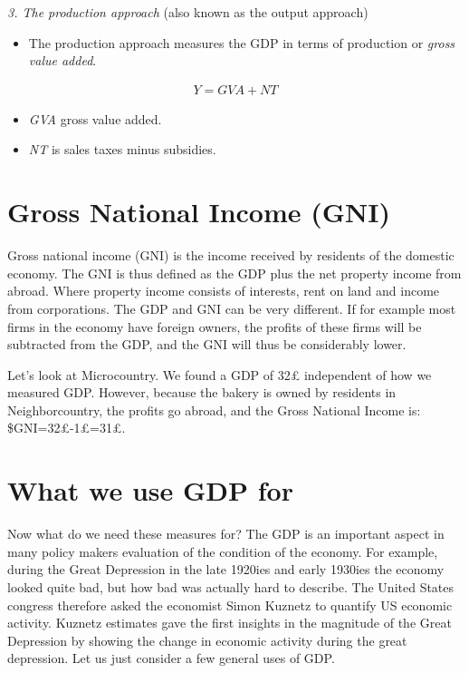 \documentclass[]{book}
\providecommand{\tightlist}{%
  \setlength{\itemsep}{0pt}\setlength{\parskip}{0pt}}
\newenvironment{myblock}%
{%
 \begin{tcolorbox}%
}%
{\end{tcolorbox}}%
\begin{document}
\begin{myblock}
\emph{3. The production approach} (also known as the output approach)

\begin{itemize}
\tightlist
\item
  The production approach measures the GDP in terms of production or
  \emph{gross value added}.
\end{itemize}

\begin{align}
  Y=GVA+NT
\end{align}

\begin{itemize}
\tightlist
\item
  \emph{GVA} gross value added.
\item
  \emph{NT} is sales taxes minus subsidies.
\end{itemize}
\end{myblock}

\hypertarget{gross-national-income-gni}{%
\section{Gross National Income (GNI)}\label{gross-national-income-gni}}

Gross national income (GNI) is the income received by residents of the domestic economy. The GNI is thus defined as the GDP plus the net property income from abroad. Where property income consists of interests, rent on land and income from corporations. The GDP and GNI can be very different. If for example most firms in the economy have foreign owners, the profits of these firms will be subtracted from the GDP, and the GNI will thus be considerably lower.

Let's look at Microcountry. We found a GDP of 32£ independent of how we measured GDP. However, because the bakery is owned by residents in Neighborcountry, the profits go abroad, and the Gross National Income is: \$GNI=32£-1£=31£.

\hypertarget{what-we-use-gdp-for}{%
\section{What we use GDP for}\label{what-we-use-gdp-for}}

Now what do we need these measures for? The GDP is an important aspect in many policy makers evaluation of the condition of the economy. For example, during the Great Depression in the late 1920ies and early 1930ies the economy looked quite bad, but how bad was actually hard to describe. The United States congress therefore asked the economist Simon Kuznetz to quantify US economic activity. Kuznetz estimates gave the first insights in the magnitude of the Great Depression by showing the change in economic activity during the great depression. Let us just consider a few general uses of GDP.
\end{document}
